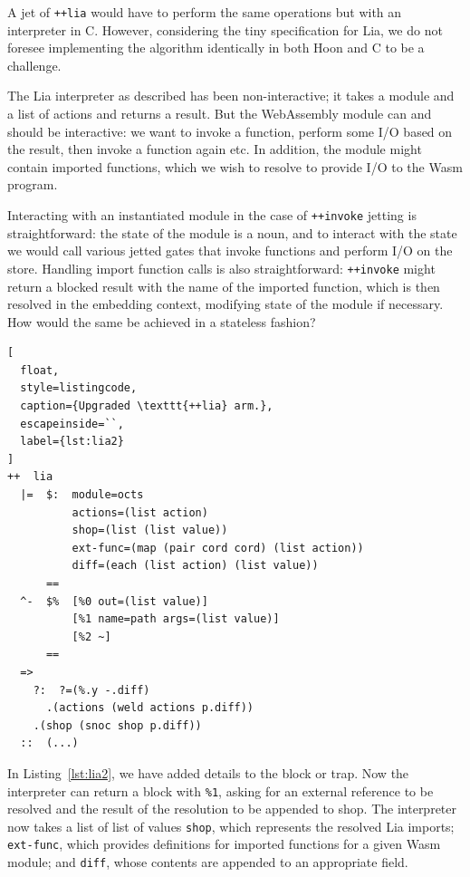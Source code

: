 \documentclass[twoside]{article}
\begin{document}
A jet of \lstinline[style=inlinecode]{++lia} would have to perform the same operations but with an interpreter in C. However, considering the tiny specification for Lia, we do not foresee implementing the algorithm identically in both Hoon and C to be a challenge.

The Lia interpreter as described has been non-interactive; it takes a module and a list of actions and returns a result. But the WebAssembly module can and should be interactive: we want to invoke a function, perform some I/O based on the result, then invoke a function again etc. In addition, the module might contain imported functions, which we wish to resolve to provide I/O to the Wasm program.

Interacting with an instantiated module in the case of \lstinline[style=inlinecode]{++invoke} jetting is straightforward: the state of the module is a noun, and to interact with the state we would call various jetted gates that invoke functions and perform I/O on the store. Handling import function calls is also straightforward: \lstinline[style=inlinecode]{++invoke} might return a blocked result with the name of the imported function, which is then resolved in the embedding context, modifying state of the module if necessary. How would the same be achieved in a stateless fashion?

\begin{lstlisting}[
  float,
  style=listingcode,
  caption={Upgraded \texttt{++lia} arm.},
  escapeinside=``,
  label={lst:lia2}
]
++  lia
  |=  $:  module=octs
          actions=(list action)
          shop=(list (list value))
          ext-func=(map (pair cord cord) (list action))
          diff=(each (list action) (list value))
      ==
  ^-  $%  [%0 out=(list value)]
          [%1 name=path args=(list value)]
          [%2 ~]
      ==
  =>
    ?:  ?=(%.y -.diff)
      .(actions (weld actions p.diff))
    .(shop (snoc shop p.diff))
  ::  (...)
\end{lstlisting}

In Listing~\ref{lst:lia2}, we have added details to the block or trap.  Now the interpreter can return a block with \lstinline[style=inlinecode]{%1}, asking for an external reference to be resolved and the result of the resolution to be appended to shop. The interpreter now takes a list of list of values \lstinline[style=inlinecode]{shop}, which represents the resolved Lia imports; \lstinline[style=inlinecode]{ext-func}, which provides definitions for imported functions for a given Wasm module; and \lstinline[style=inlinecode]{diff}, whose contents are appended to an appropriate field.
\end{document}
